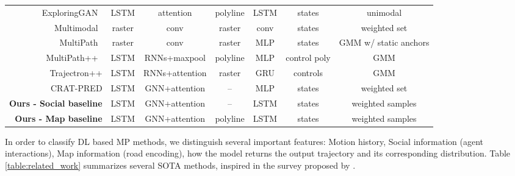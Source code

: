 \begin{table*}[t]
\begin{center}
\begin{tabular}{r |ccc|c|c|c}
			ExploringGAN~\cite{gomez2022exploring}	& LSTM	& attention	& polyline	& LSTM	& states	& unimodal	\\
			Multimodal~\cite{cui2019multimodal}	& raster	& conv	& raster	& conv	& states	& weighted set	\\
			MultiPath~\cite{chai2019multipath}	& raster	& conv	& raster	& MLP	& states	& GMM w/ static anchors	\\
			MultiPath++~\cite{varadarajan2021multipath++}	& LSTM	& RNNs+maxpool	& polyline	& MLP	& control poly	& GMM	\\
			Trajectron++\cite{salzmann2020trajectron++}	& LSTM	& RNNs+attention	& raster	& GRU	& controls	& GMM	\\
			CRAT-PRED\cite{schmidt2022crat}	& LSTM	& GNN+attention	& --	& MLP	& states	& weighted set	\\
			\midrule					
			\textbf{Ours - Social baseline}	& LSTM	& GNN+attention	& --	& LSTM	& states	& weighted samples	\\
			\textbf{Ours - Map baseline}	& LSTM	& GNN+attention	& polyline 	& LSTM	& states	& weighted samples	\\
			\bottomrule
		\end{tabular}
		\label{table:related_work}
	\end{center}
\end{table*} 

In order to classify DL based MP methods, we distinguish several important features: Motion history, Social information (agent interactions), Map information (road encoding), how the model returns the output trajectory and its corresponding distribution. Table \ref{table:related_work} summarizes several SOTA methods, inspired in the survey proposed by \cite{varadarajan2021multipath++}.

